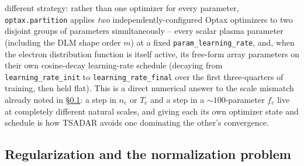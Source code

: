 \documentclass[11pt]{article}
\newcommand{\code}[1]{\texttt{#1}}
\begin{document}
different strategy: rather than one optimizer for every parameter, \code{optax.partition}
applies \emph{two} independently-configured Optax optimizers to two disjoint groups of
parameters simultaneously -- every scalar plasma parameter (including the DLM shape order
$m$) at a fixed \code{param\_learning\_rate}, and, when the electron distribution function
is itself active, its free-form array parameters on their own cosine-decay learning-rate
schedule (decaying from \code{learning\_rate\_init} to \code{learning\_rate\_final} over the
first three-quarters of training, then held flat). This is a direct numerical answer to the
scale mismatch already noted in \S\ref{sec:regularization}: a step in $n_e$ or $T_e$ and a
step in a $\sim\!100$-parameter $f_e$ live at completely different natural scales, and
giving each its own optimizer state and schedule is how TSADAR avoids one dominating the
other's convergence.

\subsection{Regularization and the normalization problem}\label{sec:regularization}
\end{document}
